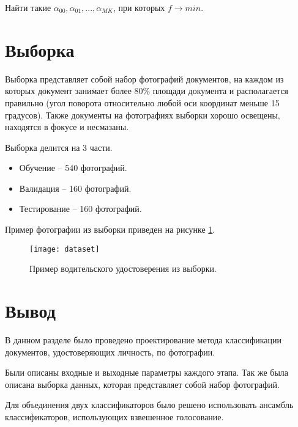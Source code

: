 Найти такие $\alpha_{00}, \alpha_{01}, ..., \alpha_{MK}$, при которых $f \rightarrow min$.

\section{Выборка}

Выборка представляет собой набор фотографий документов, на каждом из которых документ занимает более 80\% площади документа и располагается правильно (угол поворота относительно любой оси координат меньше 15 градусов). Также документы на фотографиях выборки хорошо освещены, находятся в фокусе и несмазаны.

Выборка делится на 3 части.
\begin{itemize}
\item Обучение -- 540 фотографий.
\item Валидация -- 160 фотографий.
\item Тестирование -- 160 фотографий.
\end{itemize}

Пример фотографии из выборки приведен на рисунке \ref{img:dataset}.

\begin{figure}[H]
	\centering
	\texttt{[image: dataset]}
	\caption{Пример водительского удостоверения из выборки. }
	\label{img:dataset}
\end{figure}

\section{Вывод}

В данном разделе было проведено проектирование метода классификации документов, удостоверяющих личность, по фотографии.

Были описаны входные и выходные параметры каждого этапа. Так же была описана выборка данных, которая представляет собой набор фотографий. 

Для объединения двух классификаторов было решено использовать ансамбль классификаторов, использующих взвешенное голосование.